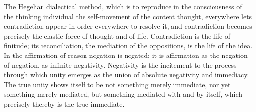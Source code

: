 The Hegelian dialectical method, which is to reproduce in the
consciousness of the thinking individual the self-movement of the
content thought, everywhere lets contradiction appear in order
everywhere to resolve it, and contradiction becomes precisely the
elastic force of thought and of life. Contradiction is the life of
finitude; its reconciliation, the mediation of the oppositions, is the
life of the idea. In the affirmation of reason negation is negated; it
is affirmation as the negation of negation, as infinite negativity.
Negativity
is the incitement to the process through which unity emerges as the
union of absolute negativity and immediacy. The true unity shows itself
to be not something merely immediate, nor yet something merely mediated,
but something mediated with and by itself, which precisely thereby is
the true immediate. ---

